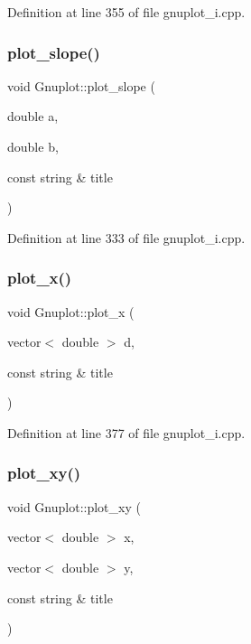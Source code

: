Definition at line 355 of file gnuplot\+\_\+i.\+cpp.

\mbox{\label{class_gnuplot_a80c9d9e6bc3e64db073d9d39d6ec5d5f}} 
\subsubsection{\texorpdfstring{plot\+\_\+slope()}{plot\_slope()}}
{\footnotesize\ttfamily void Gnuplot\+::plot\+\_\+slope (\begin{DoxyParamCaption}\item[{double}]{a,  }\item[{double}]{b,  }\item[{const string \&}]{title }\end{DoxyParamCaption})}



Definition at line 333 of file gnuplot\+\_\+i.\+cpp.

\mbox{\label{class_gnuplot_ae3b7c28efb53f636431b9655085906be}} 
\subsubsection{\texorpdfstring{plot\+\_\+x()}{plot\_x()}}
{\footnotesize\ttfamily void Gnuplot\+::plot\+\_\+x (\begin{DoxyParamCaption}\item[{vector$<$ double $>$}]{d,  }\item[{const string \&}]{title }\end{DoxyParamCaption})}



Definition at line 377 of file gnuplot\+\_\+i.\+cpp.

\mbox{\label{class_gnuplot_a1e817a58ef3e40ceaeb128c7e6437e8a}} 
\subsubsection{\texorpdfstring{plot\+\_\+xy()}{plot\_xy()}}
{\footnotesize\ttfamily void Gnuplot\+::plot\+\_\+xy (\begin{DoxyParamCaption}\item[{vector$<$ double $>$}]{x,  }\item[{vector$<$ double $>$}]{y,  }\item[{const string \&}]{title }\end{DoxyParamCaption})}



